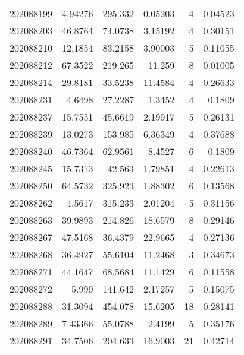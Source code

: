 \begin{tabular}{rrrrrr}
 202088199 &          4.94276 &      295.332  &            0.05203 &           4 & 0.04523 \\
 202088203 &         46.8764  &       74.0738 &            3.15192 &           4 & 0.30151 \\
 202088210 &         12.1854  &       83.2158 &            3.90003 &           5 & 0.11055 \\
 202088212 &         67.3522  &      219.265  &           11.259   &           8 & 0.01005 \\
 202088214 &         29.8181  &       33.5238 &           11.4584  &           4 & 0.26633 \\
 202088231 &          4.6498  &       27.2287 &            1.3452  &           4 & 0.1809  \\
 202088237 &         15.7551  &       45.6619 &            2.19917 &           5 & 0.26131 \\
 202088239 &         13.0273  &      153.985  &            6.36349 &           4 & 0.37688 \\
 202088240 &         46.7364  &       62.9561 &            8.4527  &           6 & 0.1809  \\
 202088245 &         15.7313  &       42.563  &            1.79851 &           4 & 0.22613 \\
 202088250 &         64.5732  &      325.923  &            1.88302 &           6 & 0.13568 \\
 202088262 &          4.5617  &      315.233  &            2.01204 &           5 & 0.31156 \\
 202088263 &         39.9893  &      214.826  &           18.6579  &           8 & 0.29146 \\
 202088267 &         47.5168  &       36.4379 &           22.9665  &           4 & 0.27136 \\
 202088268 &         36.4927  &       55.6104 &           11.2468  &           3 & 0.34673 \\
 202088271 &         44.1647  &       68.5684 &           11.1429  &           6 & 0.11558 \\
 202088272 &          5.999   &      141.642  &            2.17257 &           5 & 0.15075 \\
 202088288 &         31.3094  &      454.078  &           15.6205  &          18 & 0.28141 \\
 202088289 &          7.43366 &       55.0788 &            2.4199  &           5 & 0.35176 \\
 202088291 &         34.7506  &      204.633  &           16.9003  &          21 & 0.42714 \\

\end{tabular}
